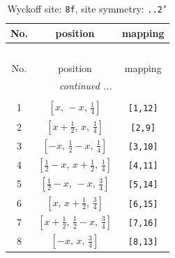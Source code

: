 \documentclass[fleqn,8pt]{jsarticle}
\begin{document}
\begin{longtable}{ccc}
\caption{Wyckoff site: {\tt 8f}, site symmetry: {\tt ..2'}}
 \\
 \hline \hline
No. & position & mapping \\ \hline \endfirsthead

\multicolumn{2}{l}{\tablename\ \thetable{}} \\
 \hline \hline
No. & position & mapping \\ \hline \endhead

 \hline \hline
\multicolumn{2}{r}{\footnotesize\it continued ...} \\ \endfoot

 \hline \hline
\multicolumn{2}{r}{} \\ \endlastfoot

1 & $\left[ x,\, - x,\, \frac{1}{4} \right]$ & {\tt [1,12]} \\ \hline
2 & $\left[ x + \frac{1}{2},\, x,\, \frac{1}{4} \right]$ & {\tt [2,9]} \\ \hline
3 & $\left[ - x,\, \frac{1}{2} - x,\, \frac{1}{4} \right]$ & {\tt [3,10]} \\ \hline
4 & $\left[ \frac{1}{2} - x,\, x + \frac{1}{2},\, \frac{1}{4} \right]$ & {\tt [4,11]} \\ \hline
5 & $\left[ \frac{1}{2} - x,\, - x,\, \frac{3}{4} \right]$ & {\tt [5,14]} \\ \hline
6 & $\left[ x,\, x + \frac{1}{2},\, \frac{3}{4} \right]$ & {\tt [6,15]} \\ \hline
7 & $\left[ x + \frac{1}{2},\, \frac{1}{2} - x,\, \frac{3}{4} \right]$ & {\tt [7,16]} \\ \hline
8 & $\left[ - x,\, x,\, \frac{3}{4} \right]$ & {\tt [8,13]} \\
\end{longtable}
\renewcommand{\arraystretch}{1.2}
\end{document}
